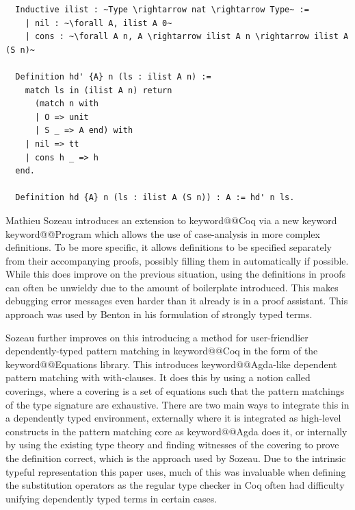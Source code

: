 \documentclass[11pt, final]{article}
\makeatletter
\def\<#1>{\csname keyword@@#1\endcsname}
\makeatother
\begin{document}
\begin{listing}
  \begin{verbatim}
  Inductive ilist : ~Type \rightarrow nat \rightarrow Type~ :=
    | nil : ~\forall A, ilist A 0~
    | cons : ~\forall A n, A \rightarrow ilist A n \rightarrow ilist A (S n)~

  Definition hd' {A} n (ls : ilist A n) :=
    match ls in (ilist A n) return
      (match n with
      | O => unit
      | S _ => A end) with
    | nil => tt
    | cons h _ => h
  end.

  Definition hd {A} n (ls : ilist A (S n)) : A := hd' n ls.
  \end{verbatim}
  \caption{Definition of a length indexed list and hd using the return keyword, adapted from Certified Programming with Dependent Types\cite{ChlipalaCPDT}.}
  \label{lst:dt_ilist}
\end{listing}

Mathieu Sozeau introduces an extension to \<Coq> via a new keyword \<Program> which allows the use of case-analysis in more complex definitions\cite{Sozeau2006}\cite{Sozeau2007}.
To be more specific, it allows definitions to be specified separately from their accompanying proofs, possibly filling them in automatically if possible.
While this does improve on the previous situation, using the definitions in proofs can often be unwieldy due to the amount of boilerplate introduced.
This makes debugging error messages even harder than it already is in a proof assistant. This approach was used by Benton in his formulation of strongly typed terms.

Sozeau further improves on this introducing a method for user-friendlier dependently-typed pattern matching in \<Coq> in the form of the \<Equations> library\cite{Sozeau2010}\cite{Sozeau2019}.
This introduces \<Agda>-like dependent pattern matching with with-clauses.
It does this by using a notion called coverings, where a covering is a set of equations such that the pattern matchings of the type signature are exhaustive.
There are two main ways to integrate this in a dependently typed environment, externally where it is integrated as high-level constructs in the pattern matching core as \<Agda> does it, or internally by using the existing type theory and finding witnesses of the covering to prove the definition correct, which is the approach used by Sozeau.
Due to the intrinsic typeful representation this paper uses, much of this was invaluable when defining the substitution operators as the regular type checker in Coq often had difficulty unifying dependently typed terms in certain cases.
\end{document}
